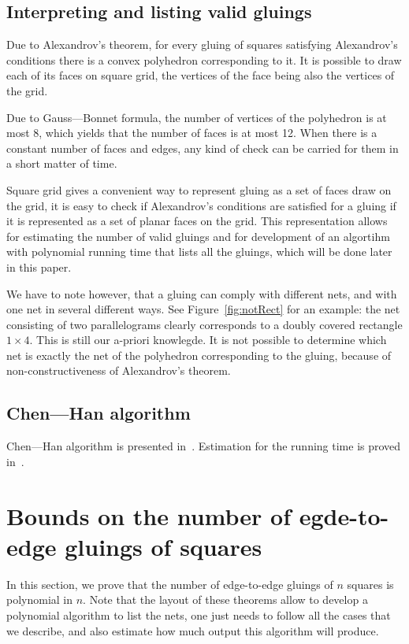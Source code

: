 \documentclass[a4paper,11pt]{article}
\begin{document}
\subsection{Interpreting and listing valid gluings}

Due to Alexandrov's theorem, for every gluing of squares satisfying Alexandrov's conditions there is a convex polyhedron corresponding to it. It is possible to draw each of its faces on square grid, the vertices of the face being also the vertices of the grid.

Due to Gauss—Bonnet formula, the number of vertices of the polyhedron is at most 8, which yields that the number of faces is at most 12. When there is a constant number of faces and edges, any kind of check can be carried for them in a short matter of time.

Square grid gives a convenient way to represent gluing as a set of faces draw on the grid, it is easy to check if Alexandrov's conditions are satisfied for a gluing if it is represented as a set of planar faces on the grid. This representation allows for estimating the number of valid gluings and for development of an algortihm with polynomial running time that lists all the gluings, which will be done later in this paper.

We have to note however, that a gluing can comply with different nets, and with one net in several different ways. See Figure~\ref{fig:notRect} for an example: the net consisting of two parallelograms clearly corresponds to a doubly covered rectangle $1 \times 4$. This is still our a-priori knowlegde. It is not possible to determine which net is exactly the net of the polyhedron corresponding to the gluing, because of non-constructiveness of Alexandrov's theorem.

\subsection{Chen—Han algorithm}

Chen—Han algorithm is presented in~\cite{chen-han}. Estimation for the running time is proved in~\cite{z-bachthesis}.

\section{Bounds on the number of egde-to-edge gluings of squares}

In this section, we prove that the number of edge-to-edge gluings of $n$ squares is polynomial in $n$. Note that the layout of these theorems allow to develop a polynomial algorithm to list the nets, one just needs to follow all the cases that we describe, and also estimate how much output this algorithm will produce.
\end{document}

